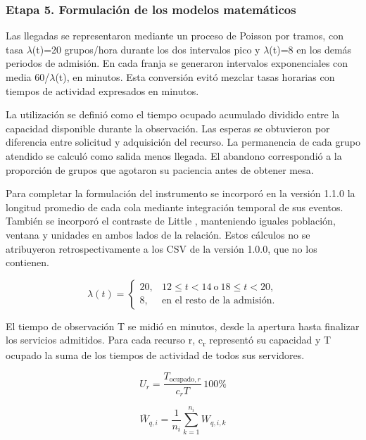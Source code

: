 \documentclass[10pt,a4paper,twocolumn]{article}
\begin{document}
\subsubsection*{Etapa 5. Formulación de los modelos matemáticos}

Las llegadas se representaron mediante un proceso de Poisson por tramos, con tasa \(\lambda\)(t)=20 grupos/hora durante los dos intervalos pico y \(\lambda\)(t)=8 en los demás periodos de admisión. En cada franja se generaron intervalos exponenciales con media 60/\(\lambda\)(t), en minutos. Esta conversión evitó mezclar tasas horarias con tiempos de actividad expresados en minutos.

La utilización se definió como el tiempo ocupado acumulado dividido entre la capacidad disponible durante la observación. Las esperas se obtuvieron por diferencia entre solicitud y adquisición del recurso. La permanencia de cada grupo atendido se calculó como salida menos llegada. El abandono correspondió a la proporción de grupos que agotaron su paciencia antes de obtener mesa.

Para completar la formulación del instrumento se incorporó en la versión 1.1.0 la longitud promedio de cada cola mediante integración temporal de sus eventos. También se incorporó el contraste de Little \cite{ref1}, manteniendo iguales población, ventana y unidades en ambos lados de la relación. Estos cálculos no se atribuyeron retrospectivamente a los CSV de la versión 1.0.0, que no los contienen.

\begin{equation}
\lambda(t)=\begin{cases}20,&12\leq t<14\ \text{o}\ 18\leq t<20,\\8,&\text{en el resto de la admisión}.\end{cases}
\end{equation}

El tiempo de observación T se midió en minutos, desde la apertura hasta finalizar los servicios admitidos. Para cada recurso r, c\textsubscript{r} representó su capacidad y T ocupado la suma de los tiempos de actividad de todos sus servidores.

\begin{equation}
U_r=\frac{T_{\mathrm{ocupado},r}}{c_r T}\,100\%
\end{equation}

\begin{equation}
\overline W_{q,i}=\frac{1}{n_i}\sum_{k=1}^{n_i}W_{q,i,k}
\end{equation}
\end{document}
